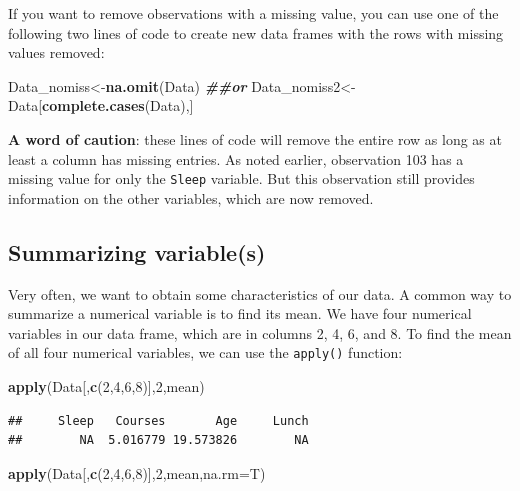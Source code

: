 \documentclass[
]{book}
\newenvironment{Shaded}{\begin{snugshade}}{\end{snugshade}}
\newcommand{\AttributeTok}[1]{\textcolor[rgb]{0.13,0.29,0.53}{#1}}
\newcommand{\DecValTok}[1]{\textcolor[rgb]{0.00,0.00,0.81}{#1}}
\newcommand{\DocumentationTok}[1]{\textcolor[rgb]{0.56,0.35,0.01}{\textbf{\textit{#1}}}}
\newcommand{\FunctionTok}[1]{\textcolor[rgb]{0.13,0.29,0.53}{\textbf{#1}}}
\newcommand{\NormalTok}[1]{#1}
\newcommand{\OtherTok}[1]{\textcolor[rgb]{0.56,0.35,0.01}{#1}}
\begin{document}
If you want to remove observations with a missing value, you can use one of the following two lines of code to create new data frames with the rows with missing values removed:

\begin{Shaded}
\begin{Highlighting}[]
\NormalTok{Data\_nomiss}\OtherTok{\textless{}{-}}\FunctionTok{na.omit}\NormalTok{(Data) }\DocumentationTok{\#\#or}
\NormalTok{Data\_nomiss2}\OtherTok{\textless{}{-}}\NormalTok{Data[}\FunctionTok{complete.cases}\NormalTok{(Data),]}
\end{Highlighting}
\end{Shaded}

\textbf{A word of caution}: these lines of code will remove the entire row as long as at least a column has missing entries. As noted earlier, observation 103 has a missing value for only the \texttt{Sleep} variable. But this observation still provides information on the other variables, which are now removed.

\hypertarget{summarizing-variables}{%
\subsection{Summarizing variable(s)}\label{summarizing-variables}}

Very often, we want to obtain some characteristics of our data. A common way to summarize a numerical variable is to find its mean. We have four numerical variables in our data frame, which are in columns 2, 4, 6, and 8. To find the mean of all four numerical variables, we can use the \texttt{apply()} function:

\begin{Shaded}
\begin{Highlighting}[]
\FunctionTok{apply}\NormalTok{(Data[,}\FunctionTok{c}\NormalTok{(}\DecValTok{2}\NormalTok{,}\DecValTok{4}\NormalTok{,}\DecValTok{6}\NormalTok{,}\DecValTok{8}\NormalTok{)],}\DecValTok{2}\NormalTok{,mean)}
\end{Highlighting}
\end{Shaded}

\begin{verbatim}
##     Sleep   Courses       Age     Lunch 
##        NA  5.016779 19.573826        NA
\end{verbatim}

\begin{Shaded}
\begin{Highlighting}[]
\FunctionTok{apply}\NormalTok{(Data[,}\FunctionTok{c}\NormalTok{(}\DecValTok{2}\NormalTok{,}\DecValTok{4}\NormalTok{,}\DecValTok{6}\NormalTok{,}\DecValTok{8}\NormalTok{)],}\DecValTok{2}\NormalTok{,mean,}\AttributeTok{na.rm=}\NormalTok{T)}
\end{Highlighting}
\end{Shaded}
\end{document}
